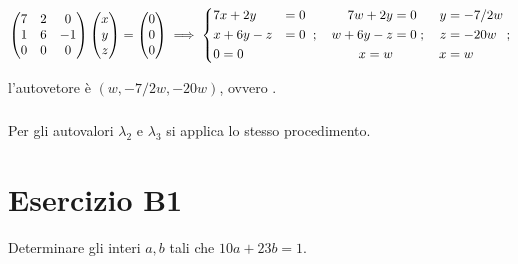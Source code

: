 \documentclass[a4paper]{report}
\newenvironment{problem}
        {
                \begin{mdframed}[topline=false,rightline=false,bottomline=false]
                        \slshape
        }
        {
                \end{mdframed}
        }
\begin{document}
        \[
                \begin{pmatrix}
                        7 & 2 & 0 \\
                        1 & 6 & -1 \\
                        0 & 0 & 0
                \end{pmatrix} \begin{pmatrix}
                        x \\
                        y \\
                        z
                \end{pmatrix} = \begin{pmatrix}
                        0 \\
                        0 \\
                        0
                \end{pmatrix} \implies
                \begin{dcases}
                        7x + 2y & = 0 \\
                        x + 6y - z & = 0 \\
                        0 = 0
                \end{dcases}\;; \quad \begin{aligned}
                        7w + 2y & = 0 \\
                        w + 6y - z & = 0 \\
                        x = w
                \end{aligned}\;; \quad \begin{aligned}
                        y & = -7/2w \\
                        z & = -20w \\
                        x & = w
                \end{aligned} \; ;
        \]

        l'autovetore \`{e} $(w, -7/2w, -20w)$, ovvero .

        \paragraph{}
        Per gli autovalori $\lambda_2$ e $\lambda_3$ si applica lo stesso procedimento.


        \chapter*{Esercizio B1}
        \begin{problem}
                Determinare gli interi $a,b$ tali che $ 10a + 23b = 1 $.
        \end{problem}
\end{document}
